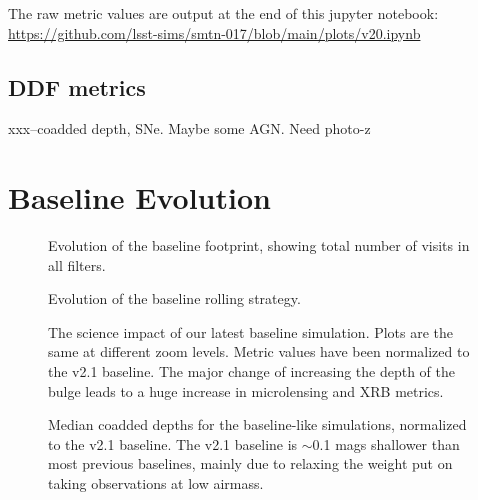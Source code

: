 The raw metric values are output at the end of this jupyter notebook: \url{https://github.com/lsst-sims/smtn-017/blob/main/plots/v20.ipynb}

\subsection{DDF metrics}

xxx--coadded depth, SNe. Maybe some AGN. Need photo-z


\section{Baseline Evolution}


\begin{figure}
\caption{Evolution of the baseline footprint, showing total number of visits in all filters.\label{fig:baseline_foot}}
\end{figure}

\begin{figure}
\caption{Evolution of the baseline rolling strategy. \label{fig:baseline_roll}}
\end{figure}

\begin{figure}
\caption{The science impact of our latest baseline simulation. Plots are the same at different zoom levels. Metric values have been normalized to the v2.1 baseline.  The major change of increasing the depth of the bulge leads to a huge increase in microlensing and XRB metrics. \label{fig:baseline2_radar}}
\end{figure}

\begin{figure}
\caption{Median coadded depths for the baseline-like simulations, normalized to the v2.1 baseline. The v2.1 baseline is $\sim$0.1 mags shallower than most previous baselines, mainly due to relaxing the weight put on taking observations at low airmass. \label{fig:baseline_mags}}
\end{figure}

